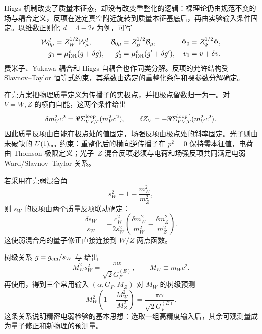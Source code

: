 Higgs 机制改变了质量本征态，却没有改变重整化的逻辑：裸理论仍由规范不变的场与耦合定义，反项在选定真空附近旋转到质量本征基底后，再由实验输入条件固定。以维数正则化 $d=4-2\epsilon$ 为例，可写
\begin{align*}
\mathcal W_{0\mu}^I&=Z_W^{1/2}\mathcal W_\mu^I,
&\mathcal B_{0\mu}&=Z_B^{1/2}\mathcal B_\mu,
&\Phi_0&=Z_\Phi^{1/2}\Phi,\\
g_0&=\mu_{\rm DR}^{\epsilon}(g+\delta g),
&g_0'&=\mu_{\rm DR}^{\epsilon}(g'+\delta g'),
&v_0&=v+\delta v.
\end{align*}
费米子、Yukawa 耦合和 Higgs 自耦合也作同类分解。反项的允许结构受 Slavnov--Taylor 恒等式约束，其系数由选定的重整化条件和裸参数分解确定。

在壳方案把物理质量定义为传播子的实极点，并把极点留数归一为一。对 $V=W,Z$ 的横向自能，这两个条件给出
\begin{equation}
\delta m_V^2c^2
=\Re\Sigma_{VV,T}^{\rm loop}(m_V^2c^2),
\qquad
\delta Z_V
=-\Re\Sigma_{VV,T}^{{\rm loop}\,'}(m_V^2c^2).
\label{eq:ew-onshell-mass-field-ct-dp11}
\end{equation}
因此质量反项由自能在极点处的值固定，场强反项由极点处的斜率固定。光子则由未破缺的 $U(1)_{\rm em}$ 约束：重整化后的横向逆传播子在 $p^2=0$ 保持零本征值，电荷由 Thomson 极限定义；光子--$Z$ 混合反项必须与电荷和场强反项共同满足电弱 Ward/Slavnov--Taylor 关系。

若采用在壳弱混合角
\begin{equation}
s_W^2\equiv1-\frac{m_W^2}{m_Z^2},
\label{eq:onshell-sw-definition-dp11}
\end{equation}
则 $s_W$ 的反项由两个质量反项联动确定：
\begin{equation}
\boxed{
\frac{\delta s_W}{s_W}
=-\frac{c_W^2}{2s_W^2}
\left(\frac{\delta m_W^2}{m_W^2}
-\frac{\delta m_Z^2}{m_Z^2}\right).}
\label{eq:sw-counterterm-massrelation-dp11}
\end{equation}
这使弱混合角的量子修正直接连接到 $W/Z$ 两点函数。

树级关系 $g=g_{\rm em}/s_W$ 与 给出
\begin{equation*}
M_W^2s_W^2=\frac{\pi\alpha}{\sqrt2G_F^{(E)}},
\qquad M_W\equiv m_Wc^2.
\end{equation*}
再使用，得到三个常用输入 $(\alpha,G_F,M_Z)$ 对 $M_W$ 的树级预测
\begin{equation}
\boxed{
M_W^2\left(1-\frac{M_W^2}{M_Z^2}\right)
=\frac{\pi\alpha}{\sqrt2G_F^{(E)}}.}
\label{eq:mw-mz-alpha-gf-tree-dp11}
\end{equation}
这条关系说明精密电弱检验的基本思想：选取一组高精度输入后，其余可观测量成为量子修正和新物理的预测量。

